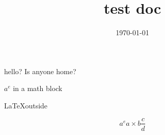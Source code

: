 \documentclass[11pt]{article}
\date{\today}
\title{test doc}
\begin{document}
\maketitle
\tableofcontents

hello? Is anyone home?

\(a^e\) in a math block

\LaTeX outside

\[ a^e a \times b \frac{c}{d} \]
\end{document}
